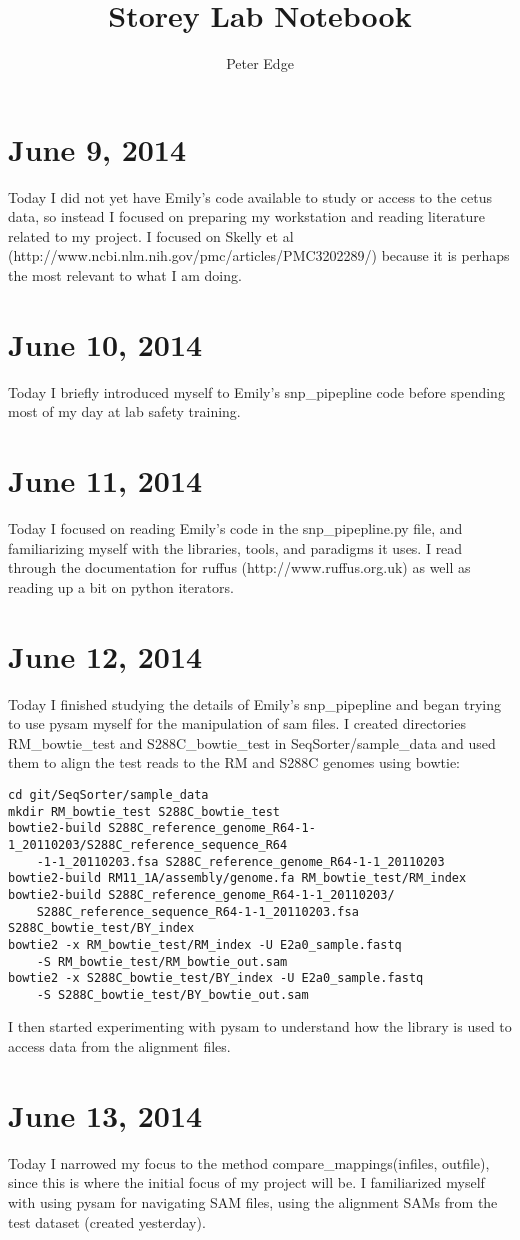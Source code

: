\documentclass[11pt]{article}
\title{\textbf{Storey Lab Notebook}}
\author{Peter Edge}
\begin{document}
\maketitle

\section*{June 9, 2014}
Today I did not yet have Emily's code available to study or access to the cetus data, so instead I focused on preparing my workstation and reading literature related to my project. I focused on Skelly et al (http://www.ncbi.nlm.nih.gov/pmc/articles/PMC3202289/) because it is perhaps the most relevant to what I am doing.

\section*{June 10, 2014}
Today I briefly introduced myself to Emily's snp\_pipepline code before spending most of my day at lab safety training.

\section*{June 11, 2014}
Today I focused on reading Emily's code in the snp\_pipepline.py file, and familiarizing myself with the libraries, tools, and paradigms it uses. I read through the documentation for ruffus (http://www.ruffus.org.uk) as well as reading up a bit on python iterators.
\section*{June 12, 2014}
Today I finished studying the details of Emily's snp\_pipepline and began trying to use pysam myself for the manipulation of sam files. I created directories RM\_bowtie\_test and S288C\_bowtie\_test in SeqSorter/sample\_data and used them to align the test reads to the RM and S288C genomes using bowtie:
\begin{verbatim}
cd git/SeqSorter/sample_data
mkdir RM_bowtie_test S288C_bowtie_test
bowtie2-build S288C_reference_genome_R64-1-1_20110203/S288C_reference_sequence_R64
    -1-1_20110203.fsa S288C_reference_genome_R64-1-1_20110203
bowtie2-build RM11_1A/assembly/genome.fa RM_bowtie_test/RM_index
bowtie2-build S288C_reference_genome_R64-1-1_20110203/
    S288C_reference_sequence_R64-1-1_20110203.fsa S288C_bowtie_test/BY_index
bowtie2 -x RM_bowtie_test/RM_index -U E2a0_sample.fastq
    -S RM_bowtie_test/RM_bowtie_out.sam
bowtie2 -x S288C_bowtie_test/BY_index -U E2a0_sample.fastq
    -S S288C_bowtie_test/BY_bowtie_out.sam
\end{verbatim}

I then started experimenting with pysam to understand how the library is used to access data from the alignment files.
\section*{June 13, 2014}
Today I narrowed my focus to the method compare\_mappings(infiles, outfile), since this is where the initial focus of my project will be. I familiarized myself with using pysam for navigating SAM files, using the alignment SAMs from the test dataset (created yesterday).
\end{document}
